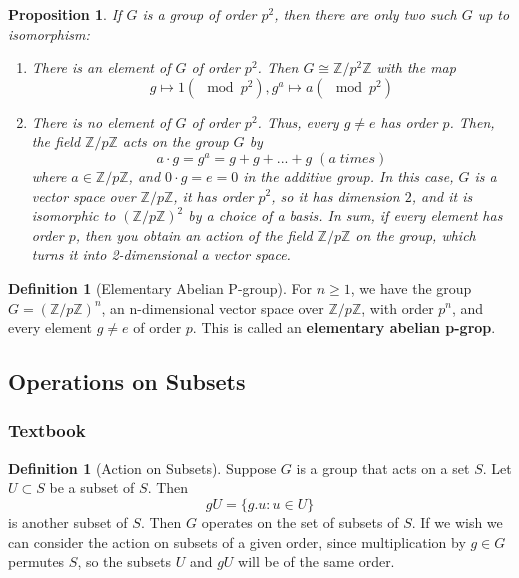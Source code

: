\documentclass[12pt]{article}
\newtheorem{prop}[thm]{Proposition}
\theoremstyle{definition}
\newtheorem{defn}[thm]{Definition}
\theoremstyle{remark}
\numberwithin{equation}{section}
\newcommand\Z{\mathbb Z}    %
\newcommand\B[1]{\textbf{ #1}}
\begin{document}
\begin{prop}
        If $G$ is a group of order $p^2$, then there are only two such $G$ up to isomorphism: \begin{enumerate}
                \item There is an element of $G$ of order $p^2$. Then $G \cong \Z/p^2\Z$ with the map \begin{equation}
                                g\mapsto 1 (\mod p^2), g^a \mapsto a (\mod p^2)
                \end{equation}
        \item There is no element of $G$ of order $p^2$. Thus, every $g \neq e$ has order $p$. Then, the field $\Z/p\Z$ acts on the group $G$ by \begin{equation}
                        a\cdot g = g^a = g+g+...+g\;(a\;times)
        \end{equation}
                        where $a \in \Z/p\Z$, and $0\cdot g = e = 0$ in the additive group. In this case, $G$ is a vector space over $\Z/p\Z$, it has order $p^2$, so it has dimension $2$, and it is isomorphic to $(\Z/p\Z)^2$ by a choice of a basis. In sum, if every element has order $p$, then you obtain an action of the field $\Z/p\Z$ on the group, which turns it into 2-dimensional a vector space.
        \end{enumerate}
\end{prop}

\vspace{15pt}

\begin{defn}[Elementary Abelian P-group]
        For $n\geq 1$, we have the group $G = (\Z/p\Z)^n$, an n-dimensional vector space over $\Z/p\Z$, with order $p^n$, and every element $g \neq e$ of order $p$. This is called an \B{elementary abelian p-grop}.
\end{defn}

\vspace{15pt}



\subsection{Operations on Subsets}

\subsubsection{Textbook}

\begin{defn}[Action on Subsets]
        Suppose $G$ is a group that acts on a set $S$. Let $U \subset S$ be a subset of $S$. Then \begin{equation}
                gU = \{g.u:u \in U\}
        \end{equation}
        is another subset of $S$. Then $G$ operates on the set of subsets of $S$. If we wish we can consider the action on subsets of a given order, since multiplication by $g \in G$ permutes $S$, so the subsets $U$ and $gU$ will be of the same order.
\end{defn}
\end{document}
